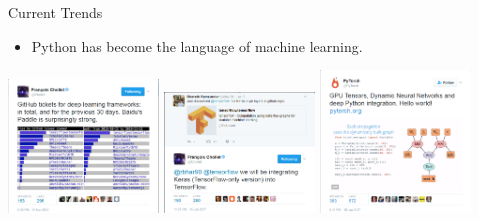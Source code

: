 \documentclass[10pt, aspectratio=169]{beamer} %
\begin{document}
\begin{frame}[fragile]{Current Trends}
\begin{itemize}
	\item Python has become the language of machine learning.
\end{itemize}
\centering
\includegraphics[width=0.3\textwidth]{images/dl-frameworks.png}\quad
\includegraphics[width=0.3\textwidth]{images/keras-tf.png}\quad
\includegraphics[width=0.3\textwidth]{images/pytorch.png}
\end{frame}
\end{document}
